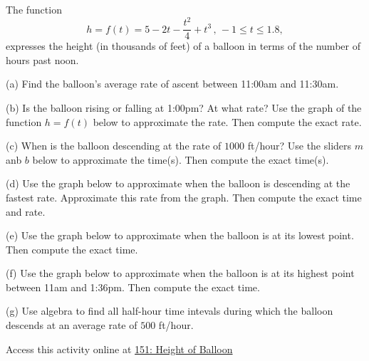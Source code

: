 \documentclass{ximera}
\begin{document}
\begin{question}  \label{Qersdfgg4t}
The function
\[
      h = f(t) = 5 -2t -\frac{t^2}{4} + t^3 \, , \, -1\leq t \leq 1.8 ,
\]
expresses the height (in thousands of feet) of a balloon in terms of the number of hours past noon.

(a) Find the balloon's average rate of ascent between 11:00am and 11:30am.

(b) Is the balloon rising or falling at 1:00pm? At what rate? Use the graph of the function $h=f(t)$ below to approximate the rate. Then compute the exact rate.

(c) When is the balloon descending at the rate of $1000$ ft/hour? Use the sliders $m$ anb $b$ below to approximate the time(s). Then compute the exact time(s).

(d) Use the graph below to approximate when the balloon is descending at the fastest rate. Approximate this rate from the graph. Then compute the exact time and rate.

(e) Use the graph below to approximate when the balloon is at its lowest point. Then compute the exact time.

(f) Use the graph below to approximate when the balloon is at its highest point between 11am and 1:36pm. Then compute the exact time.

(g) Use algebra to find all half-hour time intevals during which the balloon descends at an average rate of $500$ ft/hour.

\begin{onlineOnly}
    \begin{center}
\end{center}
\end{onlineOnly}


Access this activity online at \href{https://www.desmos.com/calculator/occgyjoawh}{151: Height of Balloon}

\end{question}
\end{document}
